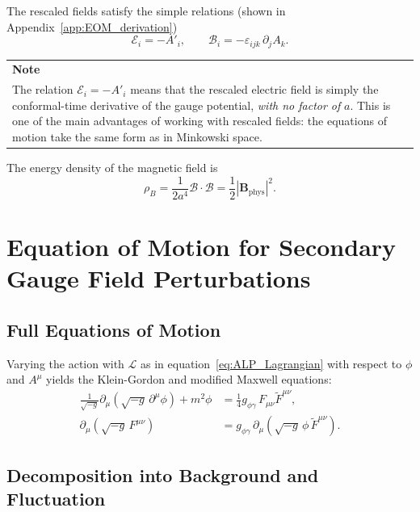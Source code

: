 \documentclass[12pt,a4paper]{report}
\newenvironment{notebox}[1][Note]{%
  \par\medskip\noindent
  \begin{tabular}{|p{\dimexpr\linewidth-2\tabcolsep-2\arrayrulewidth\relax}|}
  \hline
  \textbf{#1}\\[2pt]
}{%
  \\ \hline
  \end{tabular}
  \par\medskip
}
\newcommand{\gag}{g_{\phi\gamma}}
\renewcommand{\vec}[1]{\boldsymbol{#1}}
\theoremstyle{definition}
\begin{document}
The rescaled fields satisfy the simple relations (shown in Appendix~\ref{app:EOM_derivation})
\begin{equation}
  \mathcal{E}_i = -A'_i, \qquad \mathcal{B}_i = -\varepsilon_{ijk}\,\partial_j A_k.
  \label{eq:rescaled_fields}
\end{equation}

\begin{notebox}
The relation $\mathcal{E}_i = -A'_i$ means that the rescaled electric field is simply
the conformal-time derivative of the gauge potential, \emph{with no factor of} $a$.
This is one of the main advantages of working with rescaled fields: the equations of
motion take the same form as in Minkowski space.
\end{notebox}

The energy density of the magnetic field is
\begin{equation}
  \rho_B = \frac{1}{2a^4}\mathcal{B}\cdot\mathcal{B}
          = \frac{1}{2}\left|\vec{B}_{\mathrm{phys}}\right|^2.
\end{equation}

\chapter{Equation of Motion for Secondary Gauge Field Perturbations}

\section{Full Equations of Motion}

Varying the action with $\mathcal{L}$ as in equation~\eqref{eq:ALP_Lagrangian}
with respect to $\phi$ and $A^\mu$ yields the Klein-Gordon and modified Maxwell
equations:
\begin{align}
  \frac{1}{\sqrt{-g}}\partial_\mu\!\left(\sqrt{-g}\,\partial^\mu\phi\right)
    + m^2\phi &= \frac{1}{4}\gag\,F_{\mu\nu}\tilde{F}^{\mu\nu},
  \label{eq:KG}\\
  \partial_\mu\!\left(\sqrt{-g}\,F^{\mu\nu}\right)
    &= \gag\,\partial_\mu\!\left(\sqrt{-g}\,\phi\,\tilde{F}^{\mu\nu}\right).
  \label{eq:Maxwell_full}
\end{align}

\section{Decomposition into Background and Fluctuation}
\end{document}

